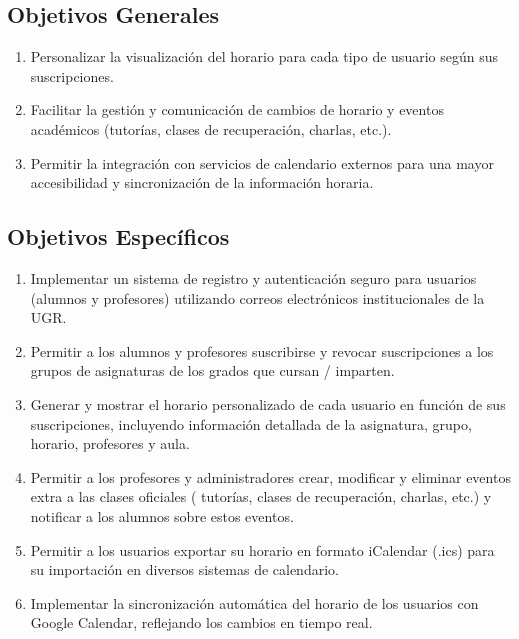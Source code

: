 \subsection{Objetivos Generales}

\begin{enumerate}
    \item Personalizar la visualización del horario para cada tipo de usuario según sus suscripciones.
    \item Facilitar la gestión y comunicación de cambios de horario y eventos académicos (tutorías, clases de recuperación, charlas, etc.).
    \item Permitir la integración con servicios de calendario externos para una mayor accesibilidad y sincronización de la información horaria.
\end{enumerate}

\subsection{Objetivos Específicos}

\begin{enumerate}
    \item Implementar un sistema de registro y autenticación seguro para usuarios (alumnos y profesores) utilizando correos electrónicos institucionales de la UGR.
    \item Permitir a los alumnos y profesores suscribirse y revocar suscripciones a los grupos de asignaturas de los grados que cursan / imparten.
    \item Generar y mostrar el horario personalizado de cada usuario en función de sus suscripciones, incluyendo información detallada de la asignatura, grupo, horario, profesores y aula.
    \item Permitir a los profesores y administradores crear, modificar y eliminar eventos extra a las clases oficiales ( tutorías, clases de recuperación, charlas, etc.) y notificar a los alumnos sobre estos eventos.
    \item Permitir a los usuarios exportar su horario en formato iCalendar (.ics) para su importación en diversos sistemas de calendario.
    \item Implementar la sincronización automática del horario de los usuarios con Google Calendar, reflejando los cambios en tiempo real.
\end{enumerate}

